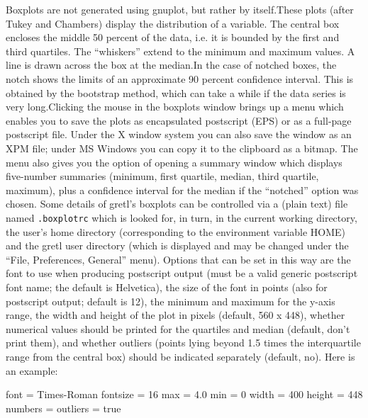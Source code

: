 Boxplots are not generated using gnuplot, but rather by 
itself.These plots (after Tukey and Chambers) display the distribution
of a variable. The central box encloses the middle 50 percent of the
data, i.e. it is bounded by the first and third quartiles.  The
``whiskers'' extend to the minimum and maximum values.  A line is
drawn across the box at the median.In the case of notched boxes, the
notch shows the limits of an approximate 90 percent confidence
interval.  This is obtained by the bootstrap method, which can take a
while if the data series is very long.Clicking the mouse in the
boxplots window brings up a menu which enables you to save the plots
as encapsulated postscript (EPS) or as a full-page postscript file.
Under the X window system you can also save the window as an XPM file;
under MS Windows you can copy it to the clipboard as a bitmap.  The
menu also gives you the option of opening a summary window which
displays five-number summaries (minimum, first quartile, median, third
quartile, maximum), plus a confidence interval for the median if the
``notched'' option was chosen.  Some details of gretl's boxplots can
be controlled via a (plain text) file named \verb+.boxplotrc+ which is
looked for, in turn, in the current working directory, the user's home
directory (corresponding to the environment variable HOME) and the
gretl user directory (which is displayed and may be changed under the
``File, Preferences, General'' menu).  Options that can be set in this
way are the font to use when producing postscript output (must be a
valid generic postscript font name; the default is Helvetica), the
size of the font in points (also for postscript output; default is
12), the minimum and maximum for the y-axis range, the width and
height of the plot in pixels (default, 560 x 448), whether numerical
values should be printed for the quartiles and median (default, don't
print them), and whether outliers (points lying beyond 1.5 times the
interquartile range from the central box) should be indicated
separately (default, no).  Here is an example:

\begin{code}
    font = Times-Roman
    fontsize = 16
    max = 4.0
    min = 0
    width = 400
    height = 448
    numbers = %
    outliers = true
\end{code}

